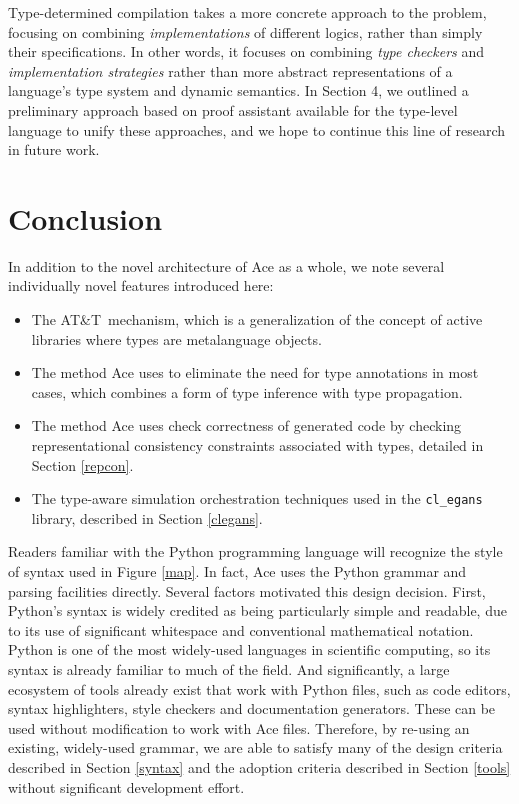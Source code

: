 \documentclass[10pt]{sigplanconf}
\newcommand{\ATT}{AT\&T}
\begin{document}
Type-determined compilation takes a more concrete approach to the problem, focusing on combining {\it implementations} of different\- logics, rather than simply their specifications. In other words, it focuses on combining {\it type checkers} and {\it implementation strategies} rather than more abstract representations of a language's type system and dynamic semantics. In Section 4, we outlined a preliminary approach based on proof assistant available for the type-level language to unify these approaches, and we hope to continue this line of research in future work.


\section{Conclusion}
In addition to the novel architecture of Ace as a whole, we note several individually novel features introduced here: %

\begin{itemize}
\item The \ATT~mechanism, which is a generalization of the concept of active libraries \cite{activelibraries}  where types are metalanguage objects.
\item The method Ace uses to eliminate the need for type annotations in most cases, which combines a form of type inference with type propagation.
\item The method Ace uses check correctness of generated code by checking representational consistency constraints associated with types, detailed in Section \ref{repcon}. 
\item The type-aware simulation orchestration techniques used in the \texttt{cl\_egans} library, described in Section \ref{clegans}.
\end{itemize}

Readers familiar with the Python programming language will recognize the style of syntax used in Figure \ref{map}. In fact, Ace uses the Python grammar and parsing facilities directly. Several factors motivated this design decision. First, Python's syntax is widely credited as being particularly simple and readable, due to its use of significant whitespace and conventional mathematical notation. Python is one of the most widely-used languages in scientific computing, so its syntax is already familiar to much of the field. And significantly, a large ecosystem of tools already exist that work with Python files, such as code editors, syntax highlighters, style checkers and documentation generators. These can be used without modification to work with Ace files. Therefore, by re-using an existing, widely-used grammar, we are able to satisfy many of the design criteria described in Section \ref{syntax} and the adoption criteria described in Section \ref{tools} without significant development effort.
\end{document}
